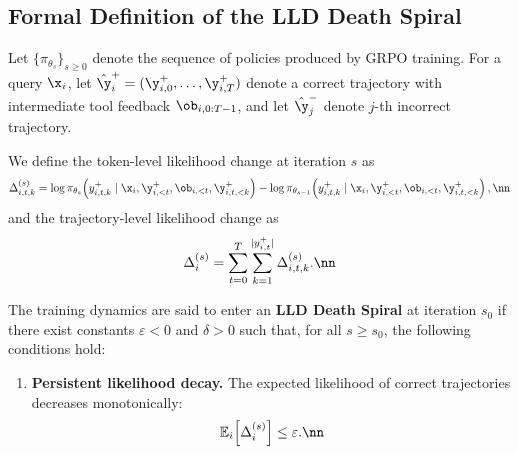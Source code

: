 \subsection{Formal Definition of the LLD Death Spiral}
\label{sec:f_lld_s}

\begin{definition}
\label{def:lld-spiral}
Let $\{\pi_{\theta_s}\}_{s\ge 0}$ denote the sequence of policies produced by GRPO training.
For a query $\x_i$, let $\hat{\y}_i^+ = (\y^+_{i,0},\dots,\y^+_{i,T})$ denote a correct trajectory with intermediate tool feedback $\ob_{i,0:T-1}$, and let $\hat{\y}_j^-$ denote $j$-th incorrect trajectory.

We define the token-level likelihood change at iteration $s$ as
\begin{equation}
\Delta^{(s)}_{i,t,k}
=
\log \pi_{\theta_s}\!\left(y^+_{i,t,k}\mid \x_i,\y^+_{i,<t},\ob_{i,<t},\y^+_{i,t,<k}\right)
-
\log \pi_{\theta_{s-1}}\!\left(y^+_{i,t,k}\mid \x_i,\y^+_{i,<t},\ob_{i,<t},\y^+_{i,t,<k}\right),
\nn
\end{equation}
and the trajectory-level likelihood change as
\begin{equation}
\Delta^{(s)}_i
=
\sum_{t=0}^{T}\sum_{k=1}^{|y^+_{i,t}|}\Delta^{(s)}_{i,t,k}.
\nn
\end{equation}

The training dynamics are said to enter an \textbf{LLD Death Spiral} at iteration $s_0$ if there exist constants $\varepsilon < 0$ and $\delta > 0$ such that, for all $s \ge s_0$, the following conditions hold:

\begin{enumerate}
    \item \textbf{Persistent likelihood decay.}
    The expected likelihood of correct trajectories decreases monotonically:
    \begin{equation}
    \mathbb{E}_{i}\!\left[\Delta^{(s)}_i\right] \le \varepsilon .
    \nn
    \end{equation}


\end{enumerate}
\end{definition}
